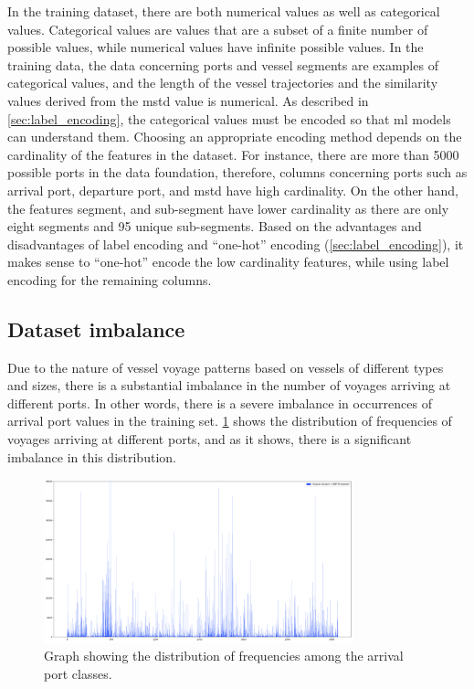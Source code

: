 In the training dataset, there are both numerical values as well as categorical values. Categorical values are values that are a subset of a finite number of possible values, while numerical values have infinite possible values. In the training data, the data concerning ports and vessel segments are examples of categorical values, and the length of the vessel trajectories and the similarity values derived from the \acrshort{mstd} value is numerical. As described in \cref{sec:label_encoding}, the categorical values must be encoded so that \acrshort{ml} models can understand them. Choosing an appropriate encoding method depends on the cardinality of the features in the dataset. For instance, there are more than 5000 possible ports in the data foundation, therefore, columns concerning ports such as arrival port, departure port, and \acrshort{mstd} have high cardinality. On the other hand, the features segment, and sub-segment have lower cardinality as there are only eight segments and 95 unique sub-segments. Based on the advantages and disadvantages of label encoding and ``one-hot'' encoding (\cref{sec:label_encoding}), it makes sense to ``one-hot'' encode the low cardinality features, while using label encoding for the remaining columns.


\subsection{Dataset imbalance}
\label{sec:dataset_imbalance}

Due to the nature of vessel voyage patterns based on vessels of different types and sizes, there is a substantial imbalance in the number of voyages arriving at different ports. In other words, there is a severe imbalance in occurrences of arrival port values in the training set. \cref{fig:data_imbalance} shows the distribution of frequencies of voyages arriving at different ports, and as it shows, there is a significant imbalance in this distribution.

\begin{figure}[htbp]
    \centering
    \includegraphics[width=0.8\textwidth]{figures/imbalance/original}
    \caption{Graph showing the distribution of frequencies among the arrival port classes.}
    \label{fig:data_imbalance}
\end{figure}

